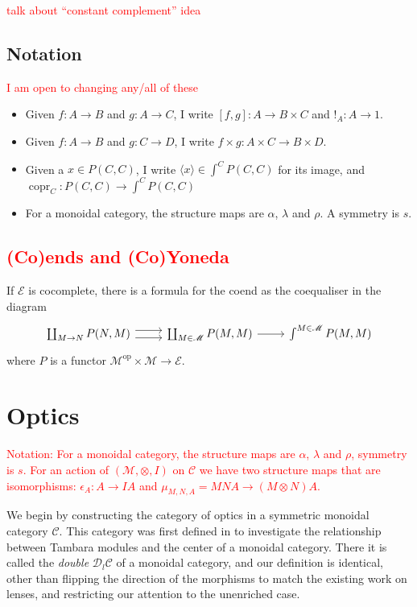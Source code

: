 \documentclass[11pt,a4paper]{article}
\theoremstyle{plain}
\theoremstyle{definition}
\newcommand{\C}{\mathscr{C}}
\newcommand{\E}{\mathscr{E}}
\newcommand{\M}{\mathscr{M}}
\newcommand{\Double}{\mathcal{D}}
\newcommand{\op}{\mathrm{op}}
\DeclareMathOperator{\copr}{copr}
\newcommand{\todo}[1]{\textcolor{red}{\small #1}}
\begin{document}
\todo{talk about ``constant complement'' idea}

\subsection{Notation}
\todo{I am open to changing any/all of these}
\begin{itemize}
\item Given $f : A \to B$ and $g : A \to C$, I write $[f, g] : A \to B \times C$ and $!_A : A \to 1$.
\item Given $f : A \to B$ and $g : C \to D$, I write $f \times g : A \times C \to B \times D$.
\item Given a $x \in P(C, C)$, I write $\langle x \rangle \in \int^C P(C, C)$ for its image, and $\copr_C : P(C,C) \to \int^C P(C, C)$
\item For a monoidal category, the structure maps are $\alpha$, $\lambda$ and $\rho$. A symmetry is $s$.
\end{itemize}

\todo{
\subsection{(Co)ends and (Co)Yoneda}
}
If $\E$ is cocomplete, there is a formula for the coend as the coequaliser in the diagram
\[
\begin{tikzcd}
\coprod_{M \to N} P(N, M) \ar[r,shift left=.75ex]  \ar[r,shift right=.75ex] & \coprod_{M \in \M} P(M, M) \ar[r] & \int^{M \in \M} P(M, M)
\end{tikzcd}
\]
where $P$ is a functor $\M^\op \times \M \to \E$.

\section{Optics}

\todo{ Notation: For a monoidal category, the structure maps are $\alpha$, $\lambda$ and $\rho$, symmetry is $s$. For an action of $(\M, \otimes, I)$ on $\C$ we have two structure maps that are isomorphisms: $\epsilon_A : A \to IA$ and $\mu_{M,N,A} = MNA \to (M \otimes N)A$. }

We begin by constructing the category of optics in a symmetric monoidal category $\C$. This category was first defined in \cite[Section 6]{Doubles} to investigate the relationship between Tambara modules and the center of a monoidal category. There it is called the \emph{double} $\Double_l \C$ of a monoidal category, and our definition is identical, other than flipping the direction of the morphisms to match the existing work on lenses, and restricting our attention to the unenriched case.
\end{document}
